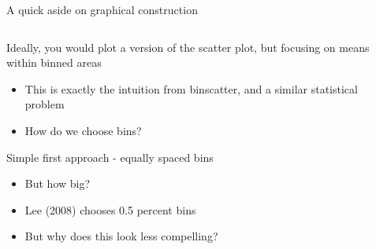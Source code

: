 \documentclass[notes,11pt, aspectratio=169]{beamer}
\newenvironment{wideitemize}{\itemize\addtolength{\itemsep}{10pt}}{\enditemize}
\begin{document}
\begin{frame}{A quick aside on graphical construction}
  \begin{columns}[onlytextwidth, T] %
    \begin{column}{.5\textwidth}
      \begin{wideitemize}
      \item Ideally, you would plot a version of the scatter plot, but
        focusing on means within binned areas
        \begin{itemize}
        \item This is exactly the intuition from binscatter, and a
          similar statistical problem
        \item How do we choose bins?
        \end{itemize}
      \item Simple first approach - equally spaced bins
        \begin{itemize}
        \item But how big?
        \item Lee (2008) chooses 0.5 percent bins
        \item But why does this look less compelling?
        \end{itemize}
      \end{wideitemize}
    \end{column}%
    \hfill%
    \begin{column}{.5\textwidth}

\end{column}
\end{columns}
\end{frame}
\end{document}
